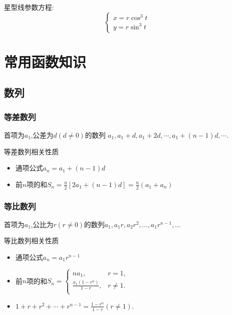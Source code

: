 \documentclass[12pt, a4paper, oneside, UTF8]{ctexbook}  %
\begin{document}
星型线参数方程:
$$
    \left\{
    \begin{array}{l}
        x=r \cos^3 t \\
        y=r \sin^3 t
    \end{array}
    \right.
$$
\section{常用函数知识}

\subsection{数列}
\subsubsection{等差数列}
首项为$a_1$,公差为$d(d \neq 0)$的数列 $a_1,a_1+d,a_1+2d,\cdots,a_1+(n-1)d,\cdots$.

\begin{criterion}{等差数列相关性质}{}
    \begin{itemize}
        \item 通项公式$a_n=a_1+(n-1)d$
        \item 前$n$项的和$S_n=\frac{n}{2}[2a_1+(n-1)d]=\frac{n}{2}(a_1+a_n)$
    \end{itemize}
\end{criterion}

\subsubsection{等比数列}
首项为$a_1$,公比为$r(r \neq 0)$的数列$a_1,a_1r,a_2r^2,...,a_1r^{n-1},...$
\begin{criterion}{等比数列相关性质}{}
    \begin{itemize}
        \item 通项公式$a_n=a_1r^{n-1}$
        \item 前$n$项的和$S_{n}=\left\{\begin{matrix}{na_{1},}&{r=1,}\\{\frac{a_{1}\left(1-r^{n}\right)}{1-r},}&{r\neq1.}\\\end{matrix}\right.$
        \item $1+r+r^2+\cdots+r^{n-1}=\frac{1-r^n}{1-r}(r\neq1).$
    \end{itemize}
\end{criterion}
\end{document}

